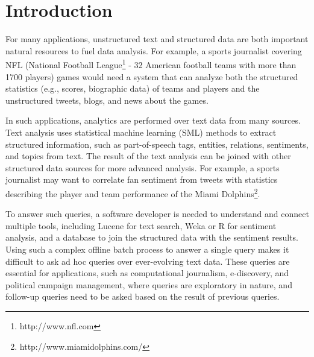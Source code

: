 

\section{Introduction}

For many
applications, unstructured text and structured data are both
important natural resources to fuel data analysis. For example, a
sports journalist covering NFL (National Football
League\footnote{http://www.nfl.com} - 32 American football teams with
more than 1700 players) games would need a system that can analyze both the
structured statistics (e.g., scores, biographic data) of teams and players and the
unstructured tweets, blogs, and news about the games.

In such applications, analytics are performed over text data
from many sources. Text analysis uses 
statistical machine learning (SML) methods to extract structured
information, such as part-of-speech tags, entities, relations, 
sentiments, and topics from
text. The result of the text analysis can be joined with other
structured data sources for more advanced analysis. For example, a sports
journalist may want to correlate fan sentiment from tweets 
with statistics describing the player and team performance
of the Miami Dolphins\footnote{http://www.miamidolphins.com/}.

To answer such queries, a software
developer is needed to understand and connect multiple tools,
including Lucene for text search, Weka or R for sentiment
analysis, and a database to join the structured data with the
sentiment results. Using such a complex offline batch process to 
answer a single query
makes it difficult to ask ad hoc queries over ever-evolving text data. 
These queries are essential for applications, such as computational journalism,
e-discovery, and political campaign management, where queries are
exploratory in nature, and follow-up queries need to be asked based
on the result of previous queries.




